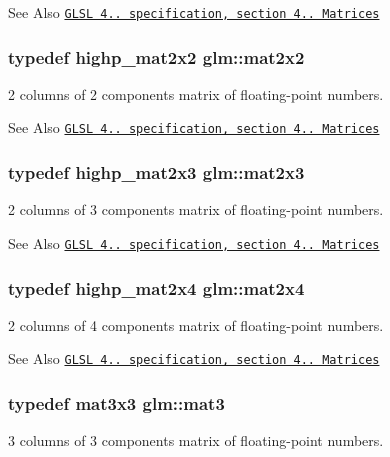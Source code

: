 \begin{DoxySeeAlso}{See Also}
\href{http://www.opengl.org/registry/doc/GLSLangSpec.4.20.8.pdf}{\tt G\-L\-S\-L 4.. specification, section 4.. Matrices} 
\end{DoxySeeAlso}
\hypertarget{group__core__types_gaeddc14adb4963d9bad73866cc202fb40}{
\subsubsection[{mat2x2}]{\setlength{\rightskip}{0pt plus 5cm}typedef highp\-\_\-mat2x2 {\bf glm\-::mat2x2}}}\label{group__core__types_gaeddc14adb4963d9bad73866cc202fb40}
2 columns of 2 components matrix of floating-\/point numbers.

\begin{DoxySeeAlso}{See Also}
\href{http://www.opengl.org/registry/doc/GLSLangSpec.4.20.8.pdf}{\tt G\-L\-S\-L 4.. specification, section 4.. Matrices} 
\end{DoxySeeAlso}
\hypertarget{group__core__types_gaea02797b8231f6dd9380345f6ff12155}{
\subsubsection[{mat2x3}]{\setlength{\rightskip}{0pt plus 5cm}typedef highp\-\_\-mat2x3 {\bf glm\-::mat2x3}}}\label{group__core__types_gaea02797b8231f6dd9380345f6ff12155}
2 columns of 3 components matrix of floating-\/point numbers.

\begin{DoxySeeAlso}{See Also}
\href{http://www.opengl.org/registry/doc/GLSLangSpec.4.20.8.pdf}{\tt G\-L\-S\-L 4.. specification, section 4.. Matrices} 
\end{DoxySeeAlso}
\hypertarget{group__core__types_gaa9bfb36efaf88ecad32369ec8a01d901}{
\subsubsection[{mat2x4}]{\setlength{\rightskip}{0pt plus 5cm}typedef highp\-\_\-mat2x4 {\bf glm\-::mat2x4}}}\label{group__core__types_gaa9bfb36efaf88ecad32369ec8a01d901}
2 columns of 4 components matrix of floating-\/point numbers.

\begin{DoxySeeAlso}{See Also}
\href{http://www.opengl.org/registry/doc/GLSLangSpec.4.20.8.pdf}{\tt G\-L\-S\-L 4.. specification, section 4.. Matrices} 
\end{DoxySeeAlso}
\hypertarget{group__core__types_gadfaff2a7dce5cbf4e77a47ecea42ac5b}{
\subsubsection[{mat3}]{\setlength{\rightskip}{0pt plus 5cm}typedef mat3x3 {\bf glm\-::mat3}}}\label{group__core__types_gadfaff2a7dce5cbf4e77a47ecea42ac5b}
3 columns of 3 components matrix of floating-\/point numbers.

